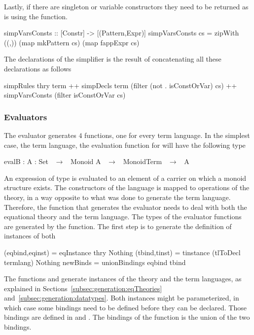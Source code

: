 Lastly, if there are singleton or variable constructors they need to be returned as is using the  function. 
\begin{hscode} 
simpVarsConsts :: [Constr] -> [(Pattern,Expr)]
simpVarsConsts cs =
  zipWith ((,)) (map mkPattern cs) (map fappExpr cs)
\end{hscode}  

The declarations of the simplifier is the result of concatenating all these declarations as follows 
\begin{hscode} 
 simpRules thry term
 ++ simpDecls term (filter (not . isConstOrVar) cs)
 ++ simpVarsConsts (filter isConstOrVar cs) 
\end{hscode} 


\subsubsection{Evaluators}
\label{sec:generation:evaluator}
The evaluator generates $4$ functions, one for every term language. In the simplest case, the  term language, the evaluation function for  will have the following type 
\begin{agdacode}
 evalB : {A  : Set}  ~$\to$~ Monoid A  ~$\to$~ MonoidTerm  ~$\to$~ A
\end{agdacode}
An expression of type  is evaluated to an element of a carrier  on which a monoid structure exists. The constructors of the language is mapped to operations of the theory, in a way opposite to what was done to generate the term language. Therefore, the function that generates the evaluator needs to deal with both the equational theory and the term language. The types of the evaluator functions are generated by the  function. The first step is to generate the definition of instances of both 
\begin{hscode}
(eqbind,eqinst) = eqInstance thry Nothing
(tbind,tinst) = tinstance (tlToDecl termlang) Nothing
newBinds = unionBindings eqbind tbind
\end{hscode}
The functions  and  generate instances of the theory and the term languages, as explained in Sections~\ref{subsec:generation:eqTheories} and~\ref{subsec:generation:datatypes}. Both instances might be parameterized, in which case some bindings need to be defined before they can be declared. Those bindings are defined in  and . The bindings of the function is the union of the two bindings. 

